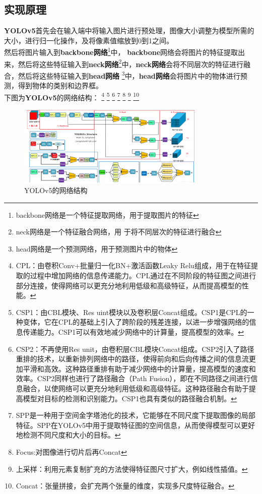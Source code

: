 \documentclass{nwputhesis}
\begin{document}
\subsection{实现原理}
\textbf{YOLOv5}首先会在输入端中将输入图片进行预处理，图像大小调整为模型所需的大小，进行归一化操作，及将像素值缩放到0到1之间。\\
\indent 然后将图片输入到\textbf{backbone网络}\footnote{backbone网络是一个特征提取网络，用于提取图片的特征}中，
\textbf{backbone}网络会将图片的特征提取出来，然后将这些特征输入到\textbf{neck网络}\footnote{neck网络是一个特征融合网络，用
于将不同层次的特征进行融合}中，\textbf{neck网络}会将不同层次的特征进行融合，然后将这些特征输入到\textbf{head网络}
\footnote{head网络是一个预测网络，用于预测图片中的物体}中，\textbf{head网络}会将图片中的物体进行预测，得到物体的类别和边界框。
\\
\indent 下图为\textbf{YOLOv5}的网络结构：
\footnote{CPL：由卷积Conv+批量归一化BN+激活函数Leaky Relu组成，用于在特征提取的过程中增加网络的信息传递能力。CPL通过在不同阶段的特征图之间进行部分连接，使得网络可以更充分地利用低级和高级特征，从而提高模型的性能。}
\footnote{CSP1：由CBL模块、Res uint模块以及卷积层Concat组成。CSP1是CPL的一种变体，它在CPL的基础上引入了跨阶段的残差连接，以进一步增强网络的信息传递能力。CSP1可以有效地减少网络中的计算量，提高模型的效率。}
\footnote{CSP2：不再使用Res unit，由卷积层CBL模块Concat组成。CSP2引入了路径重排的技术，以重新排列网络中的路径，使得前向和后向传播之间的信息流更加平滑和高效。这种路径重排有助于减少网络中的计算量，提高模型的速度和效率。CSP2同样也进行了路径融合（Path Fusion），即在不同路径之间进行信息融合，以使网络可以更充分地利用低级和高级特征。这种路径融合有助于提高模型对目标的检测和识别能力。CSP1也具有类似的路径融合机制。}
\footnote{SPP是一种用于空间金字塔池化的技术，它能够在不同尺度下提取图像的局部特征。SPP在YOLOv5中用于提取特征图的空间信息，从而使得模型可以更好地检测不同尺度和大小的目标。}
\footnote{Focus:对图像进行切片后再Concat}
\footnote{上采样：利用元素复制扩充的方法使得特征图尺寸扩大，例如线性插值。}
\footnote{Concat：张量拼接，会扩充两个张量的维度，实现多尺度特征融合。}
\begin{figure}[H]
    \centering
    \includegraphics[width=0.8\textwidth]{picture/4.png}
    \caption{YOLOv5的网络结构}
\end{figure}
\makespace
\end{document}

